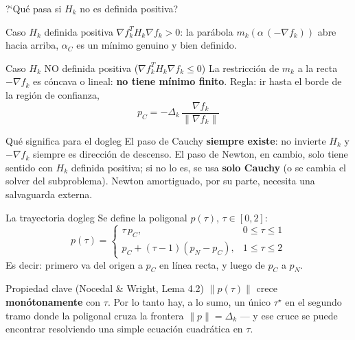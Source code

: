 \documentclass[aspectratio=169]{beamer}
\newcommand{\grad}{\nabla}
\begin{document}
\begin{frame}{?`Qu\'e pasa si $H_k$ no es definida positiva?}
  \small
  \begin{block}{Caso $H_k$ definida positiva}
    $\grad f_k^T H_k \grad f_k > 0$: la par\'abola $m_k(\alpha\,(-\grad f_k))$ abre hacia arriba, $\alpha_C$ es un m\'inimo genuino y bien definido.
  \end{block}
  \begin{block}{Caso $H_k$ NO definida positiva ($\grad f_k^T H_k \grad f_k \leq 0$)}
    La restricci\'on de $m_k$ a la recta $-\grad f_k$ es c\'oncava o lineal: \textbf{no tiene m\'inimo finito}. Regla: ir hasta el borde de la regi\'on de confianza,
    \[ p_C = -\Delta_k\, \frac{\grad f_k}{\|\grad f_k\|} \]
  \end{block}
  \begin{alertblock}{Qu\'e significa para el dogleg}
    El paso de Cauchy \textbf{siempre existe}: no invierte $H_k$ y $-\grad f_k$ siempre es direcci\'on de descenso. El paso de Newton, en cambio, solo tiene sentido con $H_k$ definida positiva; si no lo es, se usa \textbf{solo Cauchy} (o se cambia el solver del subproblema). Newton amortiguado, por su parte, necesita una salvaguarda externa.
  \end{alertblock}
\end{frame}

\begin{frame}{La trayectoria dogleg}
  Se define la poligonal $p(\tau)$, $\tau\in[0,2]$:
  \[
  p(\tau) = \begin{cases}
    \tau\, p_C, & 0 \leq \tau \leq 1 \\
    p_C + (\tau-1)(p_N - p_C), & 1 \leq \tau \leq 2
  \end{cases}
  \]
  Es decir: primero va del origen a $p_C$ en l\'inea recta, y luego de $p_C$ a $p_N$.

  \begin{alertblock}{Propiedad clave (Nocedal \& Wright, Lema 4.2)}
    $\|p(\tau)\|$ crece \textbf{mon\'otonamente} con $\tau$. Por lo tanto hay, a lo sumo, un \'unico $\tau^\star$ en el segundo tramo donde la poligonal cruza la frontera $\|p\|=\Delta_k$ --- y ese cruce se puede encontrar resolviendo una simple ecuaci\'on cuadr\'atica en $\tau$.
  \end{alertblock}
\end{frame}
\end{document}

